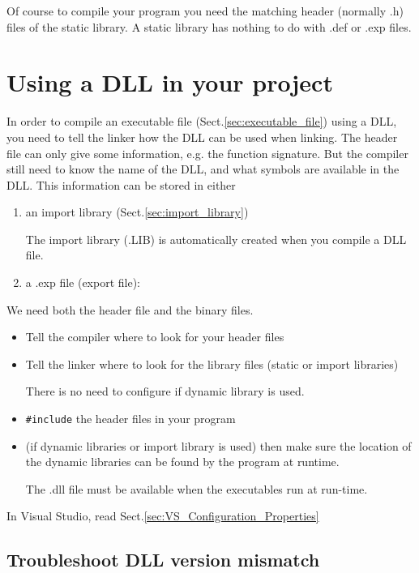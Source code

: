 Of course to compile your program you need the matching header (normally .h)
files of the static library. A static library has nothing to do with .def or
.exp files.

\section{Using a DLL in your project}

In order to compile an executable file (Sect.\ref{sec:executable_file}) using a
DLL, you need to tell the linker how the DLL can be used when linking.
The header file can only give some information, e.g. the function signature. But
the compiler still need to know the name of the DLL, and what symbols are
available in the DLL. This information can be stored in either
\begin{enumerate}
  \item an import library (Sect.\ref{sec:import_library})
  
The import library (.LIB) is automatically created when you compile a DLL file.
   
  \item a .exp file (export file): 
  
\end{enumerate}

We need both the header file and the binary files. 
\begin{itemize}
  \item Tell the compiler where to  look for your header files
  
  \item Tell the linker where to look for the library files (static or import
  libraries) 
  
There is no need to configure if dynamic library is used.
  
  \item \verb!#include! the header files in your program 
  
  \item (if dynamic libraries or import library is used) then make sure the
  location of the dynamic libraries can be found by the program at runtime.

The .dll file must be available when the executables run at run-time. 

\end{itemize}

In Visual Studio, read Sect.\ref{sec:VS_Configuration_Properties}

\subsection{Troubleshoot DLL version mismatch}

